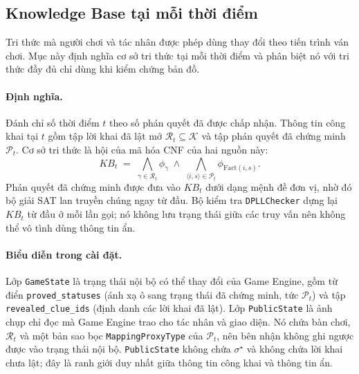 \subsection{Knowledge Base tại mỗi thời điểm}
\label{sec:knowledge_base}

Tri thức mà người chơi và tác nhân được phép dùng thay đổi theo tiến trình ván
chơi. Mục này định nghĩa cơ sở tri thức tại mỗi thời điểm và phân biệt nó với
tri thức đầy đủ chỉ dùng khi kiểm chứng bản đồ.

\paragraph{Định nghĩa.}
Đánh chỉ số thời điểm $t$ theo số phán quyết đã được chấp nhận. Thông tin công
khai tại $t$ gồm tập lời khai đã lật mở $\mathcal{R}_t \subseteq \mathcal{K}$ và
tập phán quyết đã chứng minh $\mathcal{P}_t$. Cơ sở tri thức là hội của mã hóa
CNF của hai nguồn này:
\begin{equation}
  \mathit{KB}_t \;=\;
  \bigwedge_{\gamma \in \mathcal{R}_t} \phi_\gamma
  \;\land\;
  \bigwedge_{\langle i, s\rangle \in \mathcal{P}_t} \phi_{\mathrm{Fact}(i,s)} .
  \label{eq:kb}
\end{equation}
Phán quyết đã chứng minh được đưa vào $\mathit{KB}_t$ dưới dạng mệnh đề đơn vị,
nhờ đó bộ giải SAT lan truyền chúng ngay từ đầu. Bộ kiểm tra
\texttt{DPLLChecker} dựng lại $\mathit{KB}_t$ từ đầu ở mỗi lần gọi; nó không lưu
trạng thái giữa các truy vấn nên không thể vô tình dùng thông tin ẩn.

\paragraph{Biểu diễn trong cài đặt.}
Lớp \texttt{GameState} là trạng thái nội bộ có thể thay đổi của Game Engine,
gồm từ điển \texttt{proved\_statuses} (ánh xạ ô sang trạng thái đã chứng minh,
tức $\mathcal{P}_t$) và tập \texttt{revealed\_clue\_ids} (định danh các lời khai
đã lật). Lớp \texttt{PublicState} là ảnh chụp chỉ đọc mà Game Engine trao cho
tác nhân và giao diện. Nó chứa bàn chơi, $\mathcal{R}_t$ và một bản sao bọc
\texttt{MappingProxyType} của $\mathcal{P}_t$, nên bên nhận không ghi ngược được
vào trạng thái nội bộ. \texttt{PublicState} không chứa $\sigma^\star$ và không
chứa lời khai chưa lật; đây là ranh giới duy nhất giữa thông tin công khai và
thông tin ẩn.

